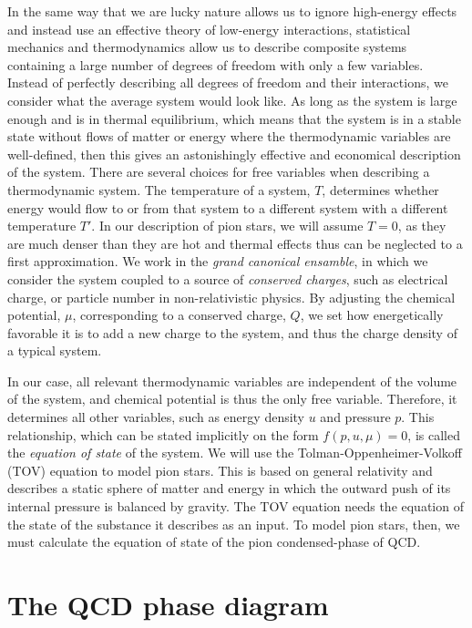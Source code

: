 In the same way that we are lucky nature allows us to ignore high-energy effects and instead use an effective theory of low-energy interactions, statistical mechanics and thermodynamics allow us to describe composite systems containing a large number of degrees of freedom with only a few variables.
Instead of perfectly describing all degrees of freedom and their interactions, we consider what the average system would look like.
As long as the system is large enough and is in thermal equilibrium, which means that the system is in a stable state without flows of matter or energy where the thermodynamic variables are well-defined, then this gives an astonishingly effective and economical description of the system.
There are several choices for free variables when describing a thermodynamic system.
The temperature of a system, $T$, determines whether energy would flow to or from that system to a different system with a different temperature $T'$.
In our description of pion stars, we will assume $T = 0$, as they are much denser than they are hot and thermal effects thus can be neglected to a first approximation.
We work in the \emph{grand canonical ensamble}, in which we consider the system coupled to a source of \emph{conserved charges}, such as electrical charge, or particle number in non-relativistic physics.
By adjusting the chemical potential, $\mu$, corresponding to a conserved charge, $Q$, we set how energetically favorable it is to add a new charge to the system, and thus the charge density of a typical system.

In our case, all relevant thermodynamic variables are independent of the volume of the system, and chemical potential is thus the only free variable.
Therefore, it determines all other variables, such as energy density $u$ and pressure $p$.
This relationship, which can be stated implicitly on the form $f(p, u, \mu) = 0$, is called the \emph{equation of state} of the system.
We will use the Tolman-Oppenheimer-Volkoff (TOV) equation to model pion stars.
This is based on general relativity and describes a static sphere of matter and energy in which the outward push of its internal pressure is balanced by gravity.
The TOV equation needs the equation of the state of the substance it describes as an input.
To model pion stars, then, we must calculate the equation of state of the pion condensed-phase of QCD.



\section{The QCD phase diagram}

